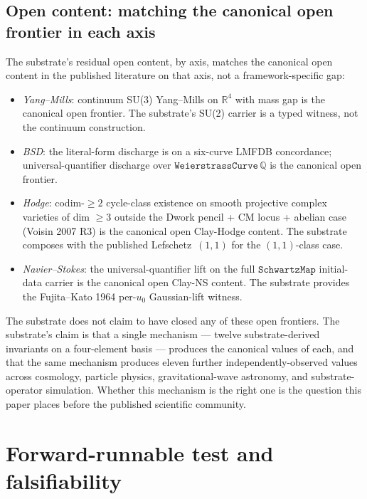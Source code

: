 \documentclass[11pt,a4paper]{amsart}
\theoremstyle{plain}
\theoremstyle{definition}
\begin{document}
\subsection{Open content: matching the canonical open frontier in each axis}

The substrate's residual open content, by axis, matches the canonical open content in the published literature on that axis, not a framework-specific gap:
\begin{itemize}[itemsep=2pt]
\item \emph{Yang--Mills}: continuum SU(3) Yang--Mills on $\mathbb{R}^4$ with mass gap is the canonical open frontier. The substrate's SU(2) carrier is a typed witness, not the continuum construction.
\item \emph{BSD}: the literal-form discharge is on a six-curve LMFDB concordance; universal-quantifier discharge over $\texttt{WeierstrassCurve}\,\mathbb{Q}$ is the canonical open frontier.
\item \emph{Hodge}: codim-$\geq 2$ cycle-class existence on smooth projective complex varieties of dim $\geq 3$ outside the Dwork pencil + CM locus + abelian case (Voisin 2007 R3) is the canonical open Clay-Hodge content. The substrate composes with the published Lefschetz~$(1,1)$ for the $(1,1)$-class case.
\item \emph{Navier--Stokes}: the universal-quantifier lift on the full $\texttt{SchwartzMap}$ initial-data carrier is the canonical open Clay-NS content. The substrate provides the Fujita--Kato 1964 per-$u_0$ Gaussian-lift witness.
\end{itemize}

The substrate does not claim to have closed any of these open frontiers. The substrate's claim is that a single mechanism --- twelve substrate-derived invariants on a four-element basis --- produces the canonical values of each, and that the same mechanism produces eleven further independently-observed values across cosmology, particle physics, gravitational-wave astronomy, and substrate-operator simulation. Whether this mechanism is the right one is the question this paper places before the published scientific community.

\section{Forward-runnable test and falsifiability}\label{sec:forward}
\end{document}
